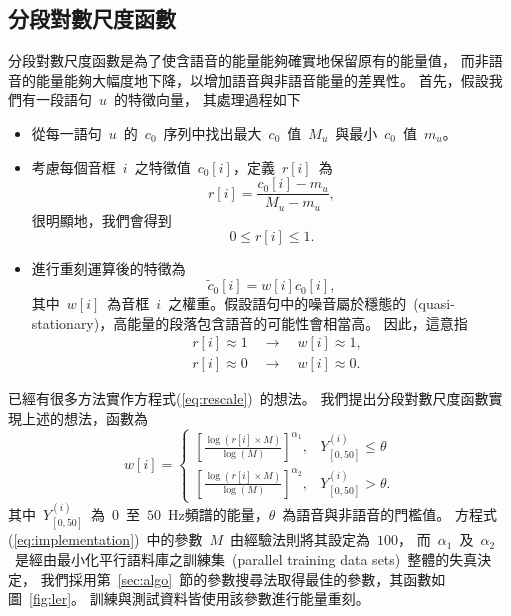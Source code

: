 \subsection{分段對數尺度函數}
\label{sec:piecewise}
分段對數尺度函數是為了使含語音的能量能夠確實地保留原有的能量值，
而非語音的能量能夠大幅度地下降，以增加語音與非語音能量的差異性。
首先，假設我們有一段語句~$u$~的特徵向量，
其處理過程如下
\begin{itemize}
\item 從每一語句~$u$~的~$c_0$~序列中找出最大~$c_0$~值~$M_u$~與最小~$c_0$~值~$m_u$。
\item 考慮每個音框~$i$~之特徵值~$c_0[i]$，定義~$r[i]$~為
  \[
	r[i] = \frac{c_0[i]-m_u}{M_u-m_u},
  \]
  很明顯地，我們會得到
  \[
  0 \le r[i] \le 1.
  \]
\item 進行重刻運算後的特徵為
  \begin{equation}
    \tilde c_0[i] = w[i] c_0[i],
  \end{equation}
  其中~$w[i]$~為音框~$i$~之權重。假設語句中的噪音屬於穩態的~(quasi-stationary)，高能量的段落包含語音的可能性會相當高。
  因此，這意指
  \begin{equation}\label{eq:rescale}
    \begin{aligned}
      &r[i] \approx 1 \quad \longrightarrow \quad w[i] \approx 1, \\ 
      &r[i] \approx 0 \quad \longrightarrow \quad w[i] \approx 0.
    \end{aligned}
  \end{equation}
\end{itemize}
已經有很多方法實作方程式(\ref{eq:rescale})~的想法。
我們提出分段對數尺度函數實現上述的想法，函數為
\begin{equation}\label{eq:implementation}
  w[i] = \begin{cases} \left[ \frac{\log \left( r[i] \times M \right)}{\log \left( M \right)} \right]^{\alpha_1}, &Y_{\left[ 0,50 \right]}^{(i)} \le \theta \\  
    \left[ \frac{\log \left( r[i] \times M \right)}{\log \left( M \right)} \right]^{\alpha_2}, &Y_{\left[ 0,50 \right]}^{(i)} > \theta. 
  \end{cases} 
\end{equation}
其中~$Y_{\left[ 0,50 \right]}^{(i)}$~為~$0$~至~$50$~Hz頻譜的能量，$\theta$~為語音與非語音的門檻值。
方程式(\ref{eq:implementation})~中的參數~$M$~由經驗法則將其設定為~$100$，
而~$\alpha_1$~及~$\alpha_2$~是經由最小化平行語料庫之訓練集~(parallel training data sets)~整體的失真決定，
我們採用第~\ref{sec:algo}~節的參數搜尋法取得最佳的參數，其函數如圖~\ref{fig:ler}。
訓練與測試資料皆使用該參數進行能量重刻。

